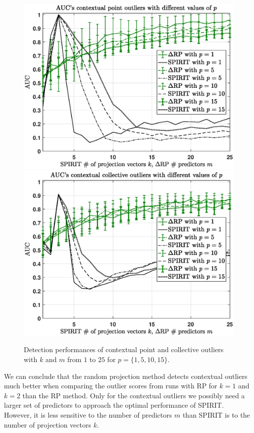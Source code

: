 \begin{figure}[h]
	\centering
	\vspace{-0.05cm}
	\includegraphics[scale=0.36]{analysis/AUCs_contextual_spiritdelta}
	\includegraphics[scale=0.36]{analysis/AUCs_collective_spiritdelta}
	\caption{Detection performances of contextual point and collective outliers with $k$ and $m$ from $1$ to $25$ for $p=\{1,5,10,15\}$.}
	\label{fig:analysis_aucs_contextual_spiritdelta}
	\vspace{-0.05cm}
\end{figure}

We can conclude that the random projection method detects contextual outliers much better when comparing the outlier scores from runs with RP for $k=1$ and $k=2$ than the RP method. Only for the contextual outliers we possibly need a larger set of predictors to approach the optimal performance of SPIRIT. However, it is less sensitive to the number of predictors $m$ than SPIRIT is to the number of projection vectors $k$.


